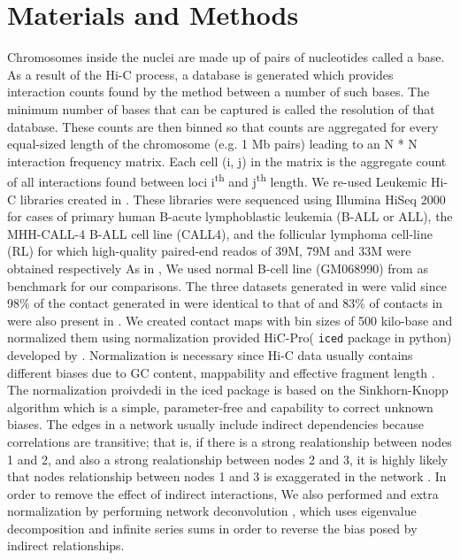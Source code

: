 \documentclass[]{article}
\begin{document}
\section{Materials and Methods}
Chromosomes inside the nuclei are made up of
pairs of nucleotides called a base. As a result of
the Hi-C process, a database is generated which
provides interaction counts found by the method between
a number of such bases. The minimum number of
bases that can be captured is called the resolution of
that database. These counts are then binned so
that counts are aggregated for every equal-sized
length of the chromosome (e.g. 1 Mb pairs) leading
to an N * N interaction frequency matrix. Each
cell (i, j) in the matrix is the aggregate count
of all interactions found between loci i\textsuperscript{th} and
j\textsuperscript{th} length.
We re-used Leukemic Hi-C libraries created in
\cite{wang2013properties}. These libraries were sequenced
using Illumina HiSeq 2000 for cases of primary human
B-acute lymphoblastic leukemia (B-ALL or ALL),
the MHH-CALL-4 B-ALL cell line (CALL4), and the
follicular lymphoma cell-line (RL) for which high-quality
paired-end reados of 39M, 79M and 33M were obtained
respectively As in \cite{wang2013properties}, We used
normal B-cell line (GM068990) from as benchmark for
our comparisons. The three datasets generated in
\cite{wang2013properties} were valid since 98\% of
the contact generated in \cite{wang2013properties}
were identical to that of \cite{lieberman2009comprehensive}
and 83\% of contacts in \cite{lieberman2009comprehensive}
were also present in \cite{wang2013properties}. We
created contact maps with bin sizes of  500 kilo-base
and normalized them using normalization provided 
HiC-Pro( \texttt{iced} package in python) developed
by \cite{servant2015hic}.
Normalization is necessary since Hi-C data usually
contains different biases due to GC content,
mappability and effective fragment length \cite{yaffe2011probabilistic,
hu2012hicnorm}. The normalization proivdedi in
the iced package is based on the Sinkhorn-Knopp
algorithm which is a simple, parameter-free and
capability to correct unknown biases.  The edges
in a network usually include indirect dependencies because
correlations are transitive; that is, if there is
a strong realationship between nodes 1 and 2,
and also a strong realationship between nodes 2
and 3, it is highly likely that nodes relationship between
nodes 1 and 3 is exaggerated in the network \cite{feizi2013network}.
In order to remove the effect of indirect interactions,
We also performed and extra normalization by
performing network deconvolution \cite{feizi2013network},
which uses eigenvalue decomposition and infinite series
sums in order to reverse the bias posed by indirect
relationships.
\end{document}
